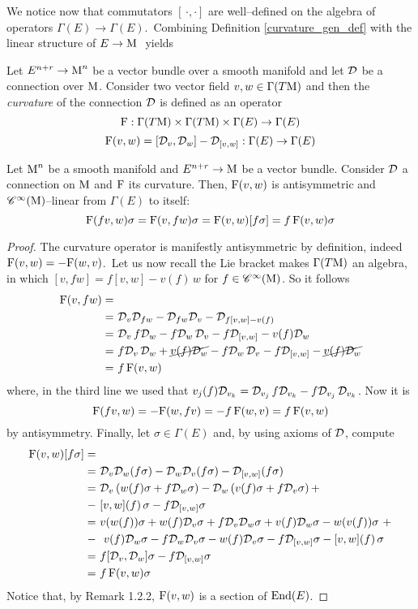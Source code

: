 We notice now that commutators $[\,\cdot,\cdot]$ are well--defined on the algebra of operators $\Gamma(E)\to\Gamma(E)$.\, Combining Definition \ref{curvature_gen_def} with the linear structure of $E\to\text{\normalfont M}\,\,$ yields

\begin{defi}
    Let $E^{n+r}\to\text{\normalfont M}^n$ be a vector bundle over a smooth manifold and let $\mathcal{D}$ be a connection over $\text{\normalfont M}$. Consider two vector field $v,w\in\Gamma(T\text{\normalfont M})$ and then the \emph{curvature} of the connection $\mathcal{D}$ is defined as an operator
    $$\text{\normalfont F}:\Gamma(T\text{\normalfont M})\times\Gamma(T\text{\normalfont M})\times\Gamma(E)\to\Gamma(E)$$
    $$\text{\normalfont F}(v,w)=[\mathcal{D}_v,\mathcal{D}_w]-\mathcal{D}_{[v,w]}:\Gamma(E)\to\Gamma(E)$$
\end{defi}

\begin{prop}\label{lin_curvature}
    Let $\text{\normalfont M}^n$ be a smooth manifold and $E^{n+r}\to\text{\normalfont M}$ be a vector bundle. Consider $\mathcal{D}$ a connection on $\text{\normalfont M}$ and $\text{\normalfont F}$ its curvature. Then, $\text{\normalfont F}(v,w)$ is antisymmetric and $\mathscr{C}^\infty(\text{\normalfont M})$--linear from $\Gamma(E)$ to itself:
    $$\text{\normalfont F}(fv,w)\sigma=\text{\normalfont F}(v,fw)\sigma=\text{\normalfont F}(v,w)[f\sigma]=f\,\text{\normalfont F}(v,w)\sigma$$
\end{prop}
\begin{proof}
    The curvature operator is manifestly antisymmetric by definition, indeed $\text{\normalfont F}(v,w)=-\text{\normalfont F}(w,v)$.\, Let us now recall the Lie bracket makes $\Gamma(T\text{\normalfont M})$ an algebra, in which $[v,fw]=f[v,w]-v(f)\,w$ for $f\in\mathscr{C}^\infty(\text{\normalfont M})$. So it follows
    \begin{align*}
        \text{\normalfont F}(v,fw)=&\\
        =&\,\,\mathcal{D}_v\mathcal{D}_{fw}-\mathcal{D}_{fw}\mathcal{D}_v-\mathcal{D}_{f[v,w]-v(f)}\\
        =&\,\,\mathcal{D}_v\,f\mathcal{D}_w-f\mathcal{D}_w\,\mathcal{D}_v-f\mathcal{D}_{[v,w]}-v(f)\mathcal{D}_w\\
        =&\,\,f\mathcal{D}_v\,\mathcal{D}_w+\cancel{v(f)\mathcal{D}_w}-f\mathcal{D}_w\,\mathcal{D}_v-f\mathcal{D}_{[v,w]}-\cancel{v(f)\mathcal{D}_w}\\
        =&\,\,f\,\text{\normalfont F}(v,w)
    \end{align*}
    where, in the third line we used that $v_j(f)\mathcal{D}_{v_k}=\mathcal{D}_{v_j}\,f\mathcal{D}_{v_k}-f\mathcal{D}_{v_j}\,\mathcal{D}_{v_k}$. Now it is
    $$\text{\normalfont F}(fv,w)=-\text{\normalfont F}(w,fv)=-f\,\text{\normalfont F}(w,v)=f\,\text{\normalfont F}(v,w)$$
    by antisymmetry. Finally, let $\sigma\in\Gamma(E)$ and, by using axioms of $\mathcal{D}$, compute
    \begin{align*}
        \text{\normalfont F}(v,w)[f\sigma]=&\\
        =&\,\,\mathcal{D}_v\mathcal{D}_w(f\sigma)-\mathcal{D}_w\mathcal{D}_v(f\sigma)-\mathcal{D}_{[v,w]}(f\sigma)\\
        =&\,\,\mathcal{D}_v\left(w(f)\sigma+f\mathcal{D}_w\sigma\right)-\mathcal{D}_w\left(v(f)\sigma+f\mathcal{D}_v\sigma\right)+\\
        -&\,\,[v,w](f)\,\sigma-f\mathcal{D}_{[v,w]}\sigma\\
        =&\,\,v(w(f))\sigma+w(f)\mathcal{D}_v\sigma+f\mathcal{D}_v\mathcal{D}_w\sigma+v(f)\mathcal{D}_w\sigma-w(v(f))\sigma\,\,+\\
        -&\,\,\,\,v(f)\mathcal{D}_w\sigma-f\mathcal{D}_w\mathcal{D}_v\sigma-w(f)\mathcal{D}_v\sigma-f\mathcal{D}_{[v,w]}\sigma-[v,w](f)\,\sigma\\
        =&\,\,f[\mathcal{D}_v,\mathcal{D}_w]\sigma-f\mathcal{D}_{[v,w]}\sigma\\
        =&\,\,f\,\text{\normalfont F}(v,w)\sigma
    \end{align*}
    Notice that, by Remark 1.2.2, $\text{\normalfont F}(v,w)$ is a section of $\text{\normalfont End}(E)$.
\end{proof}
